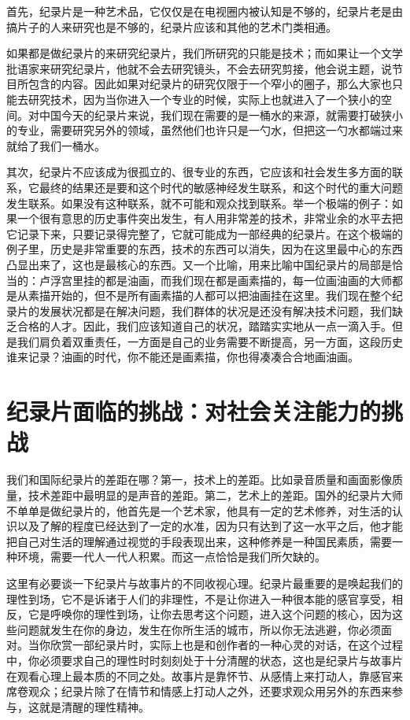 首先，纪录片是一种艺术品，它仅仅是在电视圈内被认知是不够的，纪录片老是由搞片子的人来研究也是不够的，纪录片应该和其他的艺术门类相通。

如果都是做纪录片的来研究纪录片，我们所研究的只能是技术；而如果让一个文学批语家来研究纪录片，他就不会去研究镜头，不会去研究剪接，他会说主题，说节目所包含的内容。因此如果对纪录片的研究仅限于一个窄小的圈子，那么大家也只能去研究技术，因为当你进入一个专业的时候，实际上也就进入了一个狭小的空间。对中国今天的纪录片来说，我们现在需要的是一桶水的来源，就需要打破狭小的专业，需要研究另外的领域，虽然他们也许只是一勺水，但把这一勺水都端过来就给了我们一桶水。

其次，纪录片不应该成为很孤立的、很专业的东西，它应该和社会发生多方面的联系，它最终的结果还是要和这个时代的敏感神经发生联系，和这个时代的重大问题发生联系。如果没有这种联系，就不可能和观众找到联系。举一个极端的例子：如果一个很有意思的历史事件突出发生，有人用非常差的技术，非常业余的水平去把它记录下来，只要记录得完整了，它就可能成为一部经典的纪录片。在这个极端的例子里，历史是非常重要的东西，技术的东西可以消失，因为在这里最中心的东西凸显出来了，这也是最核心的东西。又一个比喻，用来比喻中国纪录片的局部是恰当的：卢浮宫里挂的都是油画，而我们现在都是画素描的，每一位画油画的大师都是从素描开始的，但不是所有画素描的人都可以把油画挂在这里。我们现在整个纪录片的发展状况都是在解决问题，我们群体的状况是还没有解决技术问题，我们缺乏合格的人才。因此，我们应该知道自己的状况，踏踏实实地从一点一滴入手。但是我们肩负着双重责任，一方面是自己的业务需要不断提高，另一方面，这段历史谁来记录？油画的时代，你不能还是画素描，你也得凑凑合合地画油画。

\section{纪录片面临的挑战：对社会关注能力的挑战}

我们和国际纪录片的差距在哪？第一，技术上的差距。比如录音质量和画面影像质量，技术差距中最明显的是声音的差距。第二，艺术上的差距。国外的纪录片大师不单单是做纪录片的，他首先是一个艺术家，他具有一定的艺术修养，对生活的认识以及了解的程度已经达到了一定的水准，因为只有达到了这一水平之后，他才能把自己对生活的理解通过视觉的手段表现出来，这种修养是一种国民素质，需要一种环境，需要一代人一代人积累。而这一点恰恰是我们所欠缺的。

这里有必要谈一下纪录片与故事片的不同收视心理。纪录片最重要的是唤起我们的理性到场，它不是诉诸于人们的非理性，不是让你进入一种很本能的感官享受，相反，它是呼唤你的理性到场，让你去思考这个问题，进入这个问题的核心，因为这些问题就发生在你的身边，发生在你所生活的城市，所以你无法逃避，你必须面对。当你欣赏一部纪录片时，实际上也是和创作者的一种心灵的对话，在这个过程中，你必须要求自己的理性时时刻刻处于十分清醒的状态，这也是纪录片与故事片在观看心理上最本质的不同之处。故事片是靠怀节、从感情上来打动人，靠感官来席卷观众；纪录片除了在情节和情感上打动人之外，还要求观众用另外的东西来参与，这就是清醒的理性精神。


